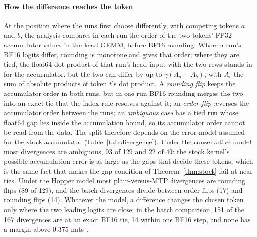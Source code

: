 \paragraph{How the difference reaches the token} At the position where the runs first choose differently, with competing tokens $a$ and $b$, the analysis compares in each run the order of the two tokens' FP32 accumulator values in the head GEMM, before BF16 rounding. Where a run's BF16 logits differ, rounding is monotone and gives that order; where they are tied, the float64 dot product of that run's head input with the two rows stands in for the accumulator, but the two can differ by up to $\gamma(A_a+A_b)$, with $A_t$ the sum of absolute products of token $t$'s dot product. A \emph{rounding flip} keeps the accumulator order in both runs, but in one run BF16 rounding merges the two into an exact tie that the index rule resolves against it; an \emph{order flip} reverses the accumulator order between the runs; an \emph{ambiguous} case has a tied run whose float64 gap lies inside the accumulation bound, so its accumulator order cannot be read from the data. The split therefore depends on the error model assumed for the stock accumulator (Table~\ref{tab:divergence}). Under the conservative model most divergences are ambiguous, 93 of 129 and 22 of 40: the stock kernel's possible accumulation error is as large as the gaps that decide these tokens, which is the same fact that makes the gap condition of Theorem~\ref{thm:stock} fail at near ties. Under the Hopper model most plain-versus-MTP divergences are rounding flips (89 of 129), and the batch divergences divide between order flips (17) and rounding flips (14). Whatever the model, a difference changes the chosen token only where the two leading logits are close: in the batch comparison, 151 of the 167 divergences are at an exact BF16 tie, 14 within one BF16 step, and none has a margin above 0.375 nats~.

